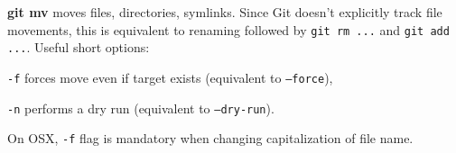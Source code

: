 %

\textbf{git mv} moves files, directories, symlinks.
Since Git doesn't explicitly track file movements, this is equivalent to renaming followed by \texttt{git rm ...} and \texttt{git add ...}.
Useful short options:
\begin{compactenum}
\item [\texttt{-f}] forces move even if target exists (equivalent to \texttt{--force}),
\item [\texttt{-n}] performs a dry run (equivalent to \texttt{--dry-run}).
\end{compactenum}

On OSX, \texttt{-f} flag is mandatory when changing capitalization of file name.

%